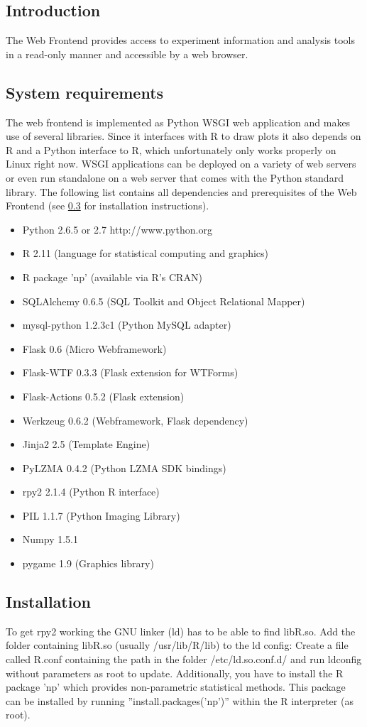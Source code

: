 \upshape
{}
\subsection{Introduction}
The Web Frontend provides access to experiment information and analysis tools in a read-only manner
and accessible by a web browser.

\subsection{System requirements}
The web frontend is implemented as Python WSGI web application and makes use of several libraries.
Since it interfaces with R to draw plots it also depends on R and a Python interface to R, which unfortunately
only works properly on Linux right now.
WSGI applications can be deployed on a variety of web servers or even run standalone on a web server that comes with the
Python standard library.
The following list contains all dependencies and prerequisites of the Web Frontend (see \ref{wf:installation} for installation instructions).
\begin{itemize}
\item Python 2.6.5 or 2.7 http://www.python.org
\item R 2.11 (language for statistical computing and graphics)
\item R package 'np' (available via R's CRAN)
\item SQLAlchemy 0.6.5 (SQL Toolkit and Object Relational Mapper)
\item mysql-python 1.2.3c1 (Python MySQL adapter)
\item Flask 0.6 (Micro Webframework)
\item Flask-WTF 0.3.3 (Flask extension for WTForms)
\item Flask-Actions 0.5.2 (Flask extension)
\item Werkzeug 0.6.2 (Webframework, Flask dependency)
\item Jinja2 2.5 (Template Engine)
\item PyLZMA 0.4.2 (Python LZMA SDK bindings)
\item rpy2 2.1.4 (Python R interface)
\item PIL 1.1.7 (Python Imaging Library)
\item Numpy 1.5.1
\item pygame 1.9 (Graphics library)
\end{itemize}

\subsection{Installation}
\label{wf:installation}
To get rpy2 working the GNU linker (ld) has to be able to find libR.so. Add the folder containing
libR.so (usually /usr/lib/R/lib) to the ld config: Create a file called R.conf containing the
path in the folder /etc/ld.so.conf.d/ and run ldconfig without parameters as root to update.
Additionally, you have to install the R package 'np' which provides non-parametric statistical
methods. This package can be installed by running ''install.packages('np')'' within the R interpreter (as root).

